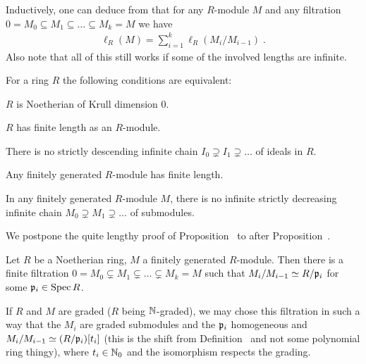 \documentclass[a4paper,parskip=half,numbers=enddot, DIV=12]{scrreprt}
\begin{document}
\begin{rem}
\begin{alphanumerate}
        \item Inductively, one can deduce from  that for any $R$-module $M$ and any filtration $0=M_0\subseteq M_1\subseteq \ldots\subseteq M_k=M$ we have 
        \begin{align*}
        	\ell_R(M)=\sum_{i=1}^{k}\ell_R(M_i/M_{i-1})\;.
        \end{align*}
        Also note that all of this still works if some of the involved lengths are infinite.
    \end{alphanumerate}
\end{rem}
\begin{prop} 
    For a ring $R$ the following conditions are equivalent:
    \begin{alphanumerate}
    \item
        $R$ is Noetherian of Krull dimension $0$.
    \item  
        $R$ has finite length as an $R$-module.
    \item
        There is no strictly descending infinite chain $I_0\supsetneq I_1\supsetneq\ldots $ of ideals in $R$.
    \item
        Any finitely generated $R$-module has finite length.
    \item 
        In any finitely generated $R$-module $M$, there is no infinite strictly decreasing infinite chain $M_0\supsetneq M_1\supsetneq \ldots$ of submodules.
    \end{alphanumerate}
\end{prop}
We postpone the quite lengthy proof of Proposition~ to after Proposition~.
\begin{prop}
    \begin{alphanumerate}
    \item {}
        Let $R$ be a Noetherian ring, $M$ a finitely generated $R$-module. Then there is a finite filtration $0 = M_0\subsetneq M_1\subsetneq\ldots\subsetneq M_k = M$ such that $M_i/M_{i-1} \simeq R/\mathfrak{p}_i$ for some $\mathfrak{p}_i\in \operatorname{Spec} R$.
    \item  
        If $R$ and $M$ are graded ($R$ being $\mathbb{N}$-graded), we may chose this filtration in such a way that the $M_i$ are graded submodules and the $\mathfrak{p}_i$ homogeneous and $M_i/M_{i-1} \simeq (R/\mathfrak{p}_i)[t_i]$ (this is the shift from Definition~ and not some polynomial ring thingy), where $t_i\in \mathbb{N}_0$ and the isomorphism respects the grading.
    \end{alphanumerate}
\end{prop}
\end{document}
